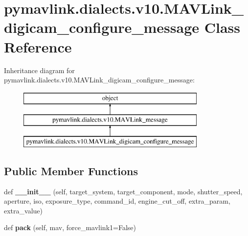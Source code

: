 \hypertarget{classpymavlink_1_1dialects_1_1v10_1_1MAVLink__digicam__configure__message}{}\section{pymavlink.\+dialects.\+v10.\+M\+A\+V\+Link\+\_\+digicam\+\_\+configure\+\_\+message Class Reference}
\label{classpymavlink_1_1dialects_1_1v10_1_1MAVLink__digicam__configure__message}
Inheritance diagram for pymavlink.\+dialects.\+v10.\+M\+A\+V\+Link\+\_\+digicam\+\_\+configure\+\_\+message\+:\begin{figure}[H]
\begin{center}
\leavevmode
\includegraphics[height=3.000000cm]{classpymavlink_1_1dialects_1_1v10_1_1MAVLink__digicam__configure__message}
\end{center}
\end{figure}
\subsection*{Public Member Functions}
\begin{DoxyCompactItemize}
\item 
\mbox{\label{classpymavlink_1_1dialects_1_1v10_1_1MAVLink__digicam__configure__message_a13964c4b14593ee489b2ae475d51a848}} 
def {\bfseries \+\_\+\+\_\+init\+\_\+\+\_\+} (self, target\+\_\+system, target\+\_\+component, mode, shutter\+\_\+speed, aperture, iso, exposure\+\_\+type, command\+\_\+id, engine\+\_\+cut\+\_\+off, extra\+\_\+param, extra\+\_\+value)
\item 
\mbox{\label{classpymavlink_1_1dialects_1_1v10_1_1MAVLink__digicam__configure__message_a8b6bd418870990462d55cdbe1e007056}} 
def {\bfseries pack} (self, mav, force\+\_\+mavlink1=False)
\end{DoxyCompactItemize}
